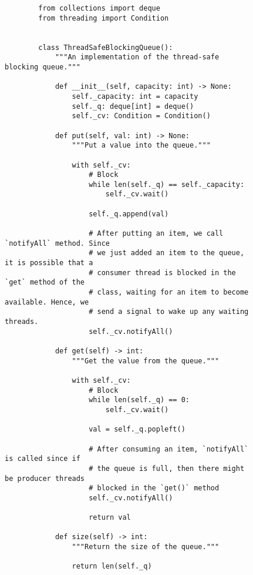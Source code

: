 \begin{figure}[H]
    \centering
    \begin{verbatim}
        from collections import deque
        from threading import Condition


        class ThreadSafeBlockingQueue():
            """An implementation of the thread-safe blocking queue."""

            def __init__(self, capacity: int) -> None:
                self._capacity: int = capacity
                self._q: deque[int] = deque()
                self._cv: Condition = Condition()

            def put(self, val: int) -> None:
                """Put a value into the queue."""

                with self._cv:
                    # Block
                    while len(self._q) == self._capacity:
                        self._cv.wait()

                    self._q.append(val)

                    # After putting an item, we call `notifyAll` method. Since
                    # we just added an item to the queue, it is possible that a
                    # consumer thread is blocked in the `get` method of the
                    # class, waiting for an item to become available. Hence, we
                    # send a signal to wake up any waiting threads.
                    self._cv.notifyAll()

            def get(self) -> int:
                """Get the value from the queue."""

                with self._cv:
                    # Block
                    while len(self._q) == 0:
                        self._cv.wait()

                    val = self._q.popleft()

                    # After consuming an item, `notifyAll` is called since if
                    # the queue is full, then there might be producer threads
                    # blocked in the `get()` method
                    self._cv.notifyAll()

                    return val

            def size(self) -> int:
                """Return the size of the queue."""

                return len(self._q)
    \end{verbatim}
\end{figure}
